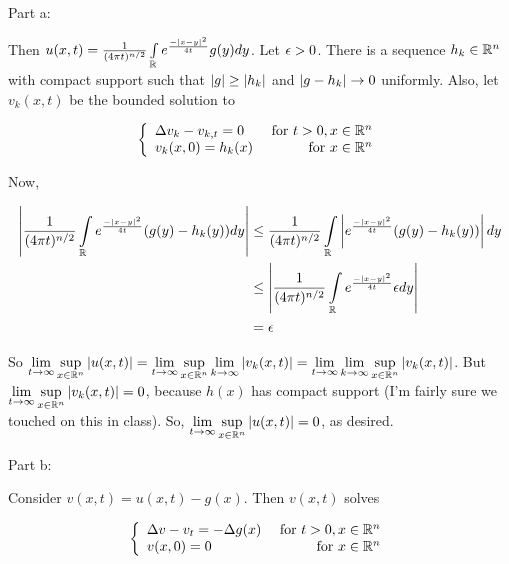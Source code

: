 \documentclass[a4paper,12pt]{article}
\begin{document}
Part a:

Then $u(x,t) = \frac{1}{(4\pi t)^{n/2}}\int\limits_{\mathbb{R}} e^{\frac{-\left\lvert x-y \right\rvert^2}{4t}} g(y) dy$. Let $\epsilon >0$. There is a sequence $h_k \in \mathbb{R}^n$ with compact support such that $\left\lvert g \right\rvert\geq \left\lvert h_k \right\rvert$ and $\left\lvert g-h_k \right\rvert \to 0$ uniformly. Also, let $v_k(x,t)$ be the bounded solution to

\begin{displaymath}
   \left\{
     \begin{array}{lr}
       \Delta v_k -v_{k,t}  = 0 & \text{ for } t>0, x \in \mathbb{R}^n \\
       v_k(x,0) = h_k(x) & \text{ for } x \in \mathbb{R}^n
     \end{array}
   \right.
\end{displaymath}


Now,  %

\begin{align*}
\left\lvert \frac{1}{(4\pi t)^{n/2}}\int\limits_{\mathbb{R}} e^{\frac{-\left\lvert x-y \right\rvert^2}{4t}} (g(y) -h_k(y)) dy \right\rvert &\leq \frac{1}{(4\pi t)^{n/2}}\int\limits_{\mathbb{R}} \left\lvert e^{\frac{-\left\lvert x-y \right\rvert^2}{4t}} (g(y) -h_k(y)) \right\rvert dy\\
&\leq \left\lvert  \frac{1}{(4\pi t)^{n/2}}\int\limits_{\mathbb{R}} e^{\frac{-\left\lvert x-y \right\rvert^2}{4t}} \epsilon dy \right\rvert\\
&= \epsilon
\end{align*}

So $\lim\limits_{t \to \infty} \sup\limits_{x \in \mathbb{R}^n} \left\lvert u(x,t) \right\rvert = \lim\limits_{t \to \infty} \sup\limits_{x \in \mathbb{R}^n} \lim\limits_{k \to \infty} \left\lvert v_k(x,t) \right\rvert = \lim\limits_{t \to \infty} \lim\limits_{k \to \infty} \sup\limits_{x \in \mathbb{R}^n} \left\lvert v_k(x,t) \right\rvert$. But $\lim\limits_{t \to \infty} \sup\limits_{x \in \mathbb{R}^n} \left\lvert v_k(x,t) \right\rvert = 0$, because $h(x)$ has compact support (I'm fairly sure we touched on this in class). So, $\lim\limits_{t \to \infty} \sup\limits_{x \in \mathbb{R}^n} \left\lvert u(x,t) \right\rvert = 0$, as desired.

\shunt

Part b: 

Consider $v(x,t) = u(x,t) - g(x)$. Then $v(x,t)$ solves

\begin{displaymath}
   \left\{
     \begin{array}{lr}
       \Delta v -v_t  = -\Delta g(x) & \text{ for } t>0, x \in \mathbb{R}^n \\
       v(x,0) = 0 & \text{ for } x \in \mathbb{R}^n
     \end{array}
   \right.
\end{displaymath}
\end{document}
